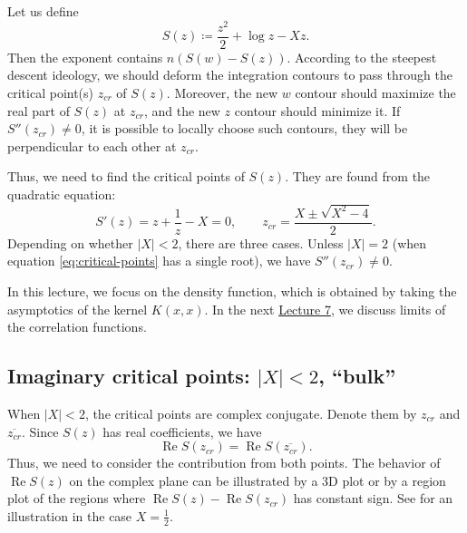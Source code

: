 \documentclass[letterpaper,11pt,oneside,reqno]{article}
\numberwithin{equation}{section}
\theoremstyle{definition}
\begin{document}
Let us define
\begin{equation*}
	S(z)\coloneqq
	\frac{z^2}{2}+\log z -X z.
\end{equation*}
Then the exponent contains $n \left( S(w)-S(z) \right)$.
According to the steepest descent ideology, we
should deform the integration contours
to pass through the critical point(s) $z_{cr}$ of $S(z)$.
Moreover, the new $w$ contour should maximize the real part of $S(z)$
at $z_{cr}$, and the new $z$ contour should minimize it.
If $S''(z_{cr})\ne 0$, it is possible to locally choose such contours,
they will be perpendicular to each other at $z_{cr}$.

Thus, we need to find the critical points of $S(z)$.
They are found from the quadratic equation:
\begin{equation}
	\label{eq:critical-points}
	S'(z)=z+\frac{1}{z}-X=0,\qquad
	z_{cr}=\frac{X\pm \sqrt{X^2-4}}{2}.
\end{equation}
Depending on whether $|X|<2$, there are three cases.
Unless $|X|=2$ (when equation \eqref{eq:critical-points} has a single root), we have
$S''(z_{cr})\ne 0$.

In this lecture, we focus on the density function, which is obtained by taking the asymptotics of the
kernel $K(x,x)$. In the next \href{https://lpetrov.cc/rmt25/rmt25-notes/rmt2025-l07.pdf}{Lecture 7},
we discuss limits of the correlation functions.

\subsection{Imaginary critical points: $|X|<2$, ``bulk''}
\label{sub:imaginary-critical-points}

When $|X|<2$, the critical points are complex conjugate.
Denote them by $z_{cr}$ and $\overline{z_{cr}}$.
Since $S(z)$ has real coefficients, we have
\begin{equation*}
	\operatorname{Re}S(z_{cr})=\operatorname{Re}S(\overline{z_{cr}}).
\end{equation*}
Thus, we need to consider the contribution from both points.
The behavior of $\operatorname{Re}S(z)$ on the complex plane
can be illustrated by a 3D plot or by a region plot of the regions
where $\operatorname{Re}S(z)-\operatorname{Re}S(z_{cr})$ has constant sign.
See  for an illustration in the case $X=\frac{1}{2}$.
\end{document}
